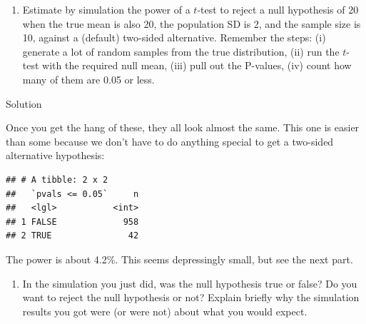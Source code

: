\documentclass[]{tufte-book}
\newenvironment{Shaded}{}{}
\newcommand{\DataTypeTok}[1]{\textcolor[rgb]{0.56,0.13,0.00}{#1}}
\newcommand{\DecValTok}[1]{\textcolor[rgb]{0.25,0.63,0.44}{#1}}
\newcommand{\FloatTok}[1]{\textcolor[rgb]{0.25,0.63,0.44}{#1}}
\newcommand{\KeywordTok}[1]{\textcolor[rgb]{0.00,0.44,0.13}{\textbf{#1}}}
\newcommand{\NormalTok}[1]{#1}
\newcommand{\OperatorTok}[1]{\textcolor[rgb]{0.40,0.40,0.40}{#1}}
\newcommand{\StringTok}[1]{\textcolor[rgb]{0.25,0.44,0.63}{#1}}
\providecommand{\tightlist}{%
  \setlength{\itemsep}{0pt}\setlength{\parskip}{0pt}}
\theoremstyle{definition}
\theoremstyle{definition}
\theoremstyle{definition}
\theoremstyle{remark}
\begin{document}
\begin{enumerate}
\def\labelenumi{(\alph{enumi})}
\setcounter{enumi}{1}
\tightlist
\item
  Estimate by simulation the power of a \(t\)-test to reject a null
  hypothesis of 20 when the true mean is also 20, the population SD is
  2, and the sample size is 10, against a (default) two-sided
  alternative. Remember the steps: (i) generate a lot of random samples
  from the true distribution, (ii) run the \(t\)-test with the required
  null mean, (iii) pull out the P-values, (iv) count how many of them
  are 0.05 or less.
\end{enumerate}

Solution

Once you get the hang of these, they all look almost the same. This one
is easier than some because we don't have to do anything special to get
a two-sided alternative hypothesis:

\begin{Shaded}
\end{Shaded}

\begin{verbatim}
## # A tibble: 2 x 2
##   `pvals <= 0.05`     n
##   <lgl>           <int>
## 1 FALSE             958
## 2 TRUE               42
\end{verbatim}

The power is about 4.2\%. This seems depressingly small, but see the
next part.

\begin{enumerate}
\def\labelenumi{(\alph{enumi})}
\setcounter{enumi}{2}
\tightlist
\item
  In the simulation you just did, was the null hypothesis true or false?
  Do you want to reject the null hypothesis or not? Explain briefly why
  the simulation results you got were (or were not) about what you would
  expect.
\end{enumerate}
\end{document}
